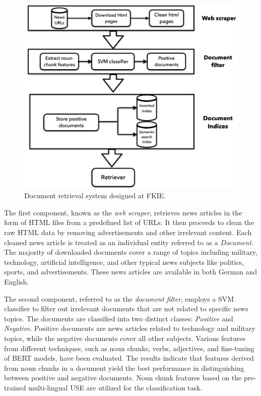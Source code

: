 \begin{figure}[h]
	\centering
	\includegraphics[width=.9\textwidth]{images/thesis_images/background.png}
	\caption[Existing work developed at FKIE.]{Document retrieval system designed at FKIE. \label{fig:background_image}}
\end{figure}

The first component, known as the \emph{web scraper}, retrieves news articles in the form of \ac{HTML} files from a predefined list of \ac{URL}s. It then proceeds to clean the raw \ac{HTML} data by removing advertisements and other irrelevant content. Each cleaned news article is treated as an individual entity referred to as a \emph{Document}. The majority of downloaded documents cover a range of topics including military, technology, artificial intelligence, and other typical news subjects like politics, sports, and advertisements. These news articles are available in both German and English.

The second component, referred to as the \emph{document filter}, employs a \ac{SVM} classifier to filter out irrelevant documents that are not related to specific news topics. The documents are classified into two distinct classes: \emph{Positive} and \emph{Negative}. Positive documents are news articles related to technology and military topics, while the negative documents cover all other subjects. Various features from different techniques, such as noun chunks, verbs, adjectives, and fine-tuning of \ac{BERT} models, have been evaluated. The results indicate that features derived from noun chunks in a document yield the best performance in distinguishing between positive and negative documents. Noun chunk features based on the pre-trained multi-lingual \ac{USE} are utilized for the classification task.

